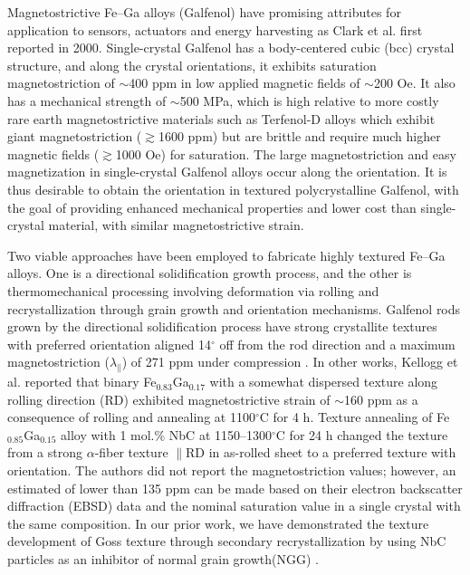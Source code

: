


Magnetostrictive Fe–Ga alloys (Galfenol) have promising attributes for application to sensors, actuators and energy harvesting as Clark et al. first reported in 2000\cite{clark2000magnetostrictive}. Single-crystal Galfenol has a body-centered
cubic (bcc) crystal structure, and along the  crystal orientations, it exhibits saturation magnetostriction of $\sim$400 ppm in low applied magnetic fields of $\sim$200 Oe. It also has a mechanical strength of $\sim$500 MPa, which is high relative to more costly rare earth magnetostrictive materials such as Terfenol-D alloys which exhibit giant magnetostriction ($\gtrsim$1600 ppm) but are brittle and require much higher magnetic fields ($\gtrsim$1000 Oe) for saturation\cite{clark2000magnetostrictive,Clark2003,Guruswamy2000}. The large magnetostriction and easy magnetization in single-crystal Galfenol alloys occur along the  orientation. It is thus desirable to obtain the  orientation in textured polycrystalline Galfenol, with the goal of providing enhanced mechanical properties and lower cost than single-crystal material, with similar magnetostrictive strain. 

Two viable approaches have been employed to fabricate highly textured Fe–Ga alloys\cite{srisukhumbowornchai2001large,kellogg2003texture}. One is a directional solidification growth process, and the other is thermomechanical processing involving deformation via rolling and recrystallization through grain growth and orientation mechanisms. Galfenol rods grown by the directional solidification process have strong crystallite textures with  preferred orientation aligned 14$^{\circ}$ off from the rod direction and a maximum magnetostriction ($\lambda_{\parallel}$) of 271 ppm under compression \cite{srisukhumbowornchai2001large}. In other works, Kellogg et al. reported that binary Fe$_{0.83}$Ga$_{0.17}$ with a somewhat dispersed  texture along rolling direction (RD) exhibited magnetostrictive strain of $\sim$160 ppm as a consequence of rolling and annealing at 1100$^{\circ}$C for 4 h\cite{kellogg2003texture}. Texture annealing of Fe$_{0.85}$Ga$_{0.15}$ alloy with 1 mol.\% NbC at 1150–1300$^{\circ}$C for 24 h changed the texture from a strong $\alpha$-fiber texture $\parallel$RD in as-rolled sheet to a preferred texture with  orientation\cite{srisukhumbowornchai2004crystallographic}. The authors did not report the magnetostriction values; however, an estimated of lower than 135 ppm can be made based on their electron backscatter diffraction (EBSD) data and the nominal saturation value in a single crystal with the same composition. In our prior work, we have demonstrated the texture development of Goss  texture through secondary recrystallization by using NbC particles as an inhibitor of normal grain growth(NGG) \cite{Na2009}.

